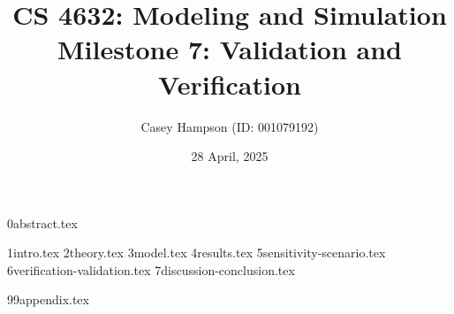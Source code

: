 \documentclass[titlepage]{article}
\title{CS 4632: Modeling and Simulation \\[5pt] Milestone 7: Validation and Verification}
\author{Casey Hampson (ID: 001079192)}
\date{28 April, 2025}
\begin{document}
    \maketitle
    \pagebreak
    \tableofcontents
    \pagebreak

    {0abstract.tex}
    \pagebreak
    
    {1intro.tex}
    {2theory.tex}
    {3model.tex}
    {4results.tex}
    {5sensitivity-scenario.tex}
    {6verification-validation.tex}
    {7discussion-conclusion.tex}

    \pagebreak
    \printbibliography
    
    \pagebreak
    \appendix
    {99appendix.tex}
\end{document}
